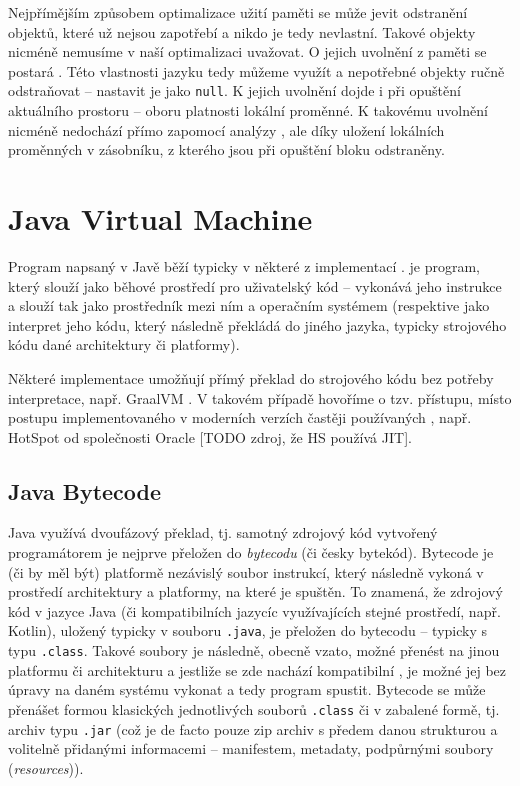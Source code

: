 Nejpřímějším způsobem optimalizace užití paměti se může jevit odstranění objektů, které už nejsou zapotřebí a nikdo je tedy nevlastní. Takové objekty nicméně nemusíme v naší optimalizaci uvažovat. O jejich uvolnění z paměti se postará . Této vlastnosti jazyku tedy můžeme využít a nepotřebné objekty ručně odstraňovat -- nastavit je jako \texttt{null}. K jejich uvolnění dojde i při opuštění aktuálního prostoru -- oboru platnosti lokální proměnné. K takovému uvolnění nicméně nedochází přímo zapomocí analýzy , ale díky uložení lokálních proměnných v zásobníku, z kterého jsou při opuštění bloku odstraněny.






\chapter{Java Virtual Machine}
Program napsaný v Javě běží typicky v některé z implementací .  je program, který slouží jako běhové prostředí pro uživatelský kód -- vykonává jeho instrukce a slouží tak jako prostředník mezi ním a operačním systémem (respektive jako interpret jeho kódu, který následně překládá do jiného jazyka, typicky strojového kódu dané architektury či platformy).

Některé implementace  umožňují přímý překlad do strojového kódu bez potřeby interpretace, např. GraalVM \cite{graalvm}. V takovém případě hovoříme o tzv.  přístupu, místo  postupu implementovaného v moderních verzích častěji používaných , např. HotSpot od společnosti Oracle [TODO zdroj, že HS používá JIT].

\section{Java Bytecode}
Java využívá dvoufázový překlad, tj. samotný zdrojový kód vytvořený programátorem je nejprve přeložen do \textit{bytecodu} (či česky bytekód). Bytecode je (či by měl být) platformě nezávislý soubor instrukcí, který následně  vykoná v prostředí architektury a platformy, na které je spuštěn. To znamená, že zdrojový kód v jazyce Java (či kompatibilních jazycíc využívajících stejné prostředí, např. Kotlin), uložený typicky v souboru \texttt{.java}, je přeložen do bytecodu -- typicky s typu \texttt{.class}. Takové soubory je následně, obecně vzato, možné přenést na jinou platformu či architekturu a jestliže se zde nachází kompatibilní , je možné jej bez úpravy na daném systému vykonat a tedy program spustit. Bytecode se může přenášet formou klasických jednotlivých souborů \texttt{.class} či v zabalené formě, tj. archiv typu \texttt{.jar} (což je de facto pouze zip archiv s předem danou strukturou a volitelně přidanými informacemi -- manifestem, metadaty, podpůrnými soubory (\textit{resources})).



